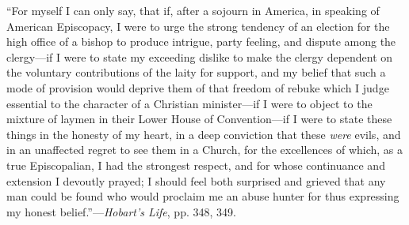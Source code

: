 ``For myself I can only say, that if, after a
sojourn in America, in speaking of American Episcopacy, I were to urge
the strong tendency of an election for the high office of a bishop to
produce intrigue, party feeling, and dispute among the clergy—if I
were to state my exceeding dislike to make the clergy dependent on the
voluntary contributions of the laity for support, and my belief that
such a mode of provision would deprive them of that freedom of rebuke
which I judge essential to the character of a Christian minister—if
I were to object to the mixture of laymen in their Lower House
of Convention—if I were to state these things in the honesty of my
heart, in a deep conviction that these \emph{were} evils, and in an
unaffected regret to see them in a Church, for the excellences of
which, as a true Episcopalian, I had the strongest respect, and for
whose continuance and extension I devoutly prayed; I should feel both
surprised and grieved that any man could be found who would proclaim
me an abuse hunter for thus expressing my honest belief.''—\emph{Hobart's
Life}, pp. 348, 349.

